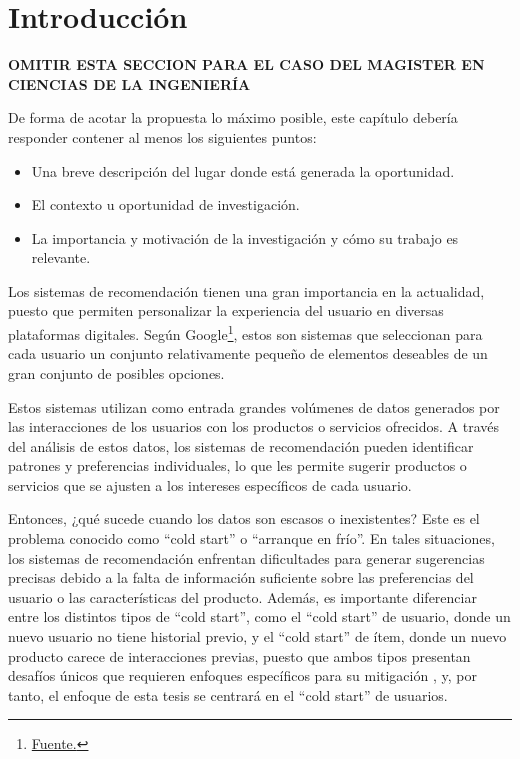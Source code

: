 \chapter{Introducción} %
\label{sec:Introduccion} %

\textbf{OMITIR ESTA SECCION PARA EL CASO DEL MAGISTER EN CIENCIAS DE LA INGENIER\'IA}

De forma de acotar la propuesta lo máximo posible, este capítulo debería responder contener al menos los siguientes puntos:
\begin{itemize}
\item Una breve descripción del lugar donde está generada la oportunidad.
\item El contexto u oportunidad de investigación.
\item La importancia y motivación de la investigación y cómo su trabajo es relevante.
\end{itemize}

\newpage
Los sistemas de recomendación tienen una gran importancia en la actualidad, puesto que permiten personalizar la experiencia del usuario en diversas plataformas digitales. Según Google\footnote{\href{https://developers.google.com/machine-learning/glossary}{Fuente.}}, estos son sistemas que seleccionan para cada usuario un conjunto relativamente pequeño de elementos deseables de un gran conjunto de posibles opciones.

Estos sistemas utilizan como entrada grandes volúmenes de datos generados por las interacciones de los usuarios con los productos o servicios ofrecidos. A través del análisis de estos datos, los sistemas de recomendación pueden identificar patrones y preferencias individuales, lo que les permite sugerir productos o servicios que se ajusten a los intereses específicos de cada usuario.

Entonces, ¿qué sucede cuando los datos son escasos o inexistentes? Este es el problema conocido como \enquote{cold start} o \enquote{arranque en frío}. En tales situaciones, los sistemas de recomendación enfrentan dificultades para generar sugerencias precisas debido a la falta de información suficiente sobre las preferencias del usuario o las características del producto. Además, es importante diferenciar entre los distintos tipos de \enquote{cold start}, como el \enquote{cold start} de usuario, donde un nuevo usuario no tiene historial previo, y el \enquote{cold start} de ítem, donde un nuevo producto carece de interacciones previas, puesto que ambos tipos presentan desafíos únicos que requieren enfoques específicos para su mitigación \cite{10339320}, y, por tanto, el enfoque de esta tesis se centrará en el \enquote{cold start} de usuarios.

